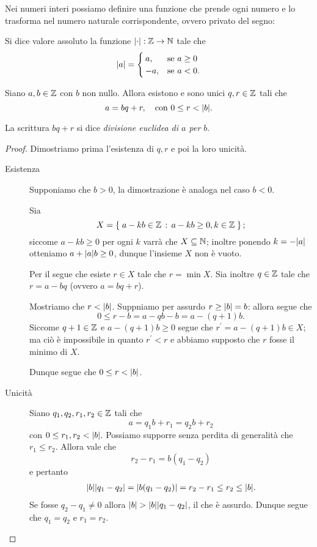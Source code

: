 Nei numeri interi possiamo definire una funzione che prende ogni numero e lo trasforma nel numero naturale corrispondente, ovvero privato del segno:
\begin{definition}
    Si dice valore assoluto la funzione $\abs*{\cdot} : \Z \to \N$ tale che \[
        \abs*{a} = \begin{cases}
            a, &\text{se } a \geq 0\\
            -a, &\text{se } a < 0.
        \end{cases}    
    \]
\end{definition}

\begin{theorem}
    Siano $a, b \in \Z$ con $b$ non nullo. Allora esistono e sono unici $q, r \in \Z$ tali che \[
        a = bq + r, \quad \text{con } 0 \leq r < \abs*{b}.    
    \]

    La scrittura $bq + r$ si dice \emph{divisione euclidea di $a$ per $b$}.
\end{theorem}
\begin{proof}
    Dimostriamo prima l'esistenza di $q, r$ e poi la loro unicità.
    \begin{description}
        \item[Esistenza] Supponiamo che $b > 0$, la dimostrazione è analoga nel caso $b < 0$. 
        
        Sia \[
            X = \set{a - kb \in \Z \suchthat a-kb \geq 0, k \in \Z};
        \] siccome $a-kb \geq 0$ per ogni $k$ varrà che $X \subseteq \N$; inoltre ponendo $k = -\abs*{a}$ otteniamo $a+ \abs*{a}b \geq 0$, dunque l'insieme $X$ non è vuoto.

        Per il  segue che esiste $r \in X$ tale che $r = \min X$. Sia inoltre $q \in \Z$ tale che $r = a - bq$ (ovvero $a = bq + r$).

        Mostriamo che $r < \abs*{b}$. Suppniamo per assurdo $r \geq \abs*{b} = b$: allora segue che \[
            0 \leq r - b = a - qb - b = a - (q+1)b.   
        \] Siccome $q+1 \in \Z$ e $a - (q+1)b \geq 0$ segue che $r^\prime = a-(q+1)b \in X$; ma ciò è impossibile in quanto $r^\prime < r$ e abbiamo supposto che $r$ fosse il minimo di $X$.

        Dunque segue che $0 \leq r < \abs*{b}$.
        \item[Unicità] Siano $q_1, q_2, r_1, r_2 \in \Z$ tali che \[
            a = q_1b + r_1 = q_2b + r_2    
        \] con $0 \leq r_1, r_2 < \abs*{b}$. Possiamo supporre senza perdita di generalità che $r_1 \leq r_2$.
        Allora vale che \[
            r_2 - r_1 = b(q_1 - q_2)  
        \] e pertanto \begin{align*}
            \abs*{b}\abs*{q_1 - q_2} = \abs*{b(q_1 - q_2)} = r_2 - r_1 \leq r_2 \leq \abs*{b}.
        \end{align*} Se fosse $q_2 - q_1 \neq 0$ allora $\abs*{b} > \abs*{b}\abs*{q_1 - q_2}$, il che è assurdo.
        Dunque segue che $q_1 = q_2$ e $r_1 = r_2$. \qedhere
    \end{description}
\end{proof}
